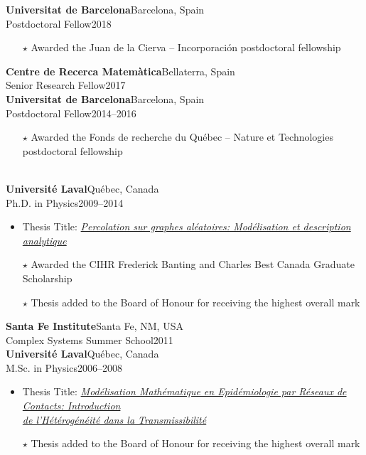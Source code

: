 \documentclass[11pt]{article}
\newcommand{\TitreSection}[1]{\colorbox{background}{\makebox[\textwidth-0.5em][c]{\Large\textrm{\textsc{#1}}}}\vspace{0.75\baselineskip}\\}
\begin{document}
%
\textbf{Universitat de Barcelona}\hfill Barcelona, Spain\\
Postdoctoral Fellow\hfill 2018
\begin{itemize}[leftmargin=1.5em]\small
  \item[$\star$] Awarded the Juan de la Cierva -- Incorporaci\'on postdoctoral fellowship
\end{itemize}
%
\textbf{Centre de Recerca Matem\`atica}\hfill Bellaterra, Spain\\
Senior Research Fellow\hfill 2017\vspace{0.75\baselineskip}\\
%
\textbf{Universitat de Barcelona}\hfill Barcelona, Spain\\
Postdoctoral Fellow\hfill 2014--2016
\begin{itemize}[leftmargin=1.5em]\small
  \item[$\star$] Awarded the Fonds de recherche du Qu\'ebec -- Nature et Technologies postdoctoral fellowship
\end{itemize} \vspace{0.75\baselineskip}
%
%
%
%
%
\TitreSection{Education}
%
\textbf{Universit\'e Laval}\hfill Qu\'ebec, Canada\\
Ph.D. in Physics\hfill 2009--2014
\begin{itemize}[leftmargin=1.5em]\small
  \item Thesis Title: \href{http://hdl.handle.net/20.500.11794/25058}{\textit{Percolation sur graphes al\'eatoires: Mod\'elisation et description analytique}}\footnotemark
  \item[$\star$] Awarded the CIHR Frederick Banting and Charles Best Canada Graduate Scholarship
  \item[$\star$] Thesis added to the Board of Honour for receiving the highest overall mark
\end{itemize}
%
\textbf{Santa Fe Institute}\hfill Santa Fe, NM, USA\\
Complex Systems Summer School\hfill 2011
\vspace{0.75\baselineskip}\\
%
\textbf{Universit\'e Laval}\hfill Qu\'ebec, Canada\\
M.Sc. in Physics\hfill 2006--2008
\begin{itemize}[leftmargin=1.5em]\small
  \item Thesis Title: \href{http://hdl.handle.net/20.500.11794/20317}{\textit{Mod\'elisation Math\'ematique en Epid\'emiologie par R\'eseaux de Contacts: Introduction\\de l'H\'et\'erog\'en\'eit\'e dans la Transmissibilit\'e}}\footnotemark
  \item[$\star$] Thesis added to the Board of Honour for receiving the highest overall mark
\end{itemize}
\end{document}
